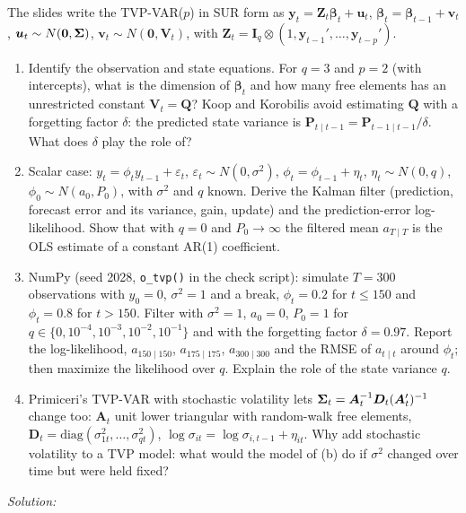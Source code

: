\documentclass[11pt,a4paper]{article}
\newif\ifsolucoes
\newcommand{\espacoresol}{4.5cm}   %
\newcommand{\resolespaco}{\ifsolucoes\else\par\textit{Solution:}\vspace{\espacoresol}\par\fi}
\begin{document}
The slides write the TVP-VAR($p$) in SUR form as $\bm y_t=\bm Z_t\bm\beta_t+\bm u_t$, $\bm\beta_t=\bm\beta_{t-1}+\bm v_t$,
$\bm u_t\sim N(\bm0,\bm{\Sigma})$, $\bm v_t\sim N(\bm0,\bm V_t)$, with $\bm Z_t=\bm I_q\otimes(1,\bm y_{t-1}',\dots,\bm y_{t-p}')$.
\begin{enumerate}[label=(\alph*),leftmargin=2em]
\item Identify the observation and state equations. For $q=3$ and $p=2$ (with intercepts), what is the dimension of
$\bm\beta_t$ and how many free elements has an unrestricted constant $\bm V_t=\bm Q$? Koop and Korobilis avoid
estimating $\bm Q$ with a forgetting factor $\delta$: the predicted state variance is $\bm P_{t\mid t-1}=\bm P_{t-1\mid t-1}/\delta$.
What does $\delta$ play the role of?
\item Scalar case: $y_t=\phi_ty_{t-1}+\varepsilon_t$, $\varepsilon_t\sim N(0,\sigma^2)$, $\phi_t=\phi_{t-1}+\eta_t$, $\eta_t\sim N(0,q)$,
$\phi_0\sim N(a_0,P_0)$, with $\sigma^2$ and $q$ known. Derive the Kalman filter (prediction, forecast error and its
variance, gain, update) and the prediction-error log-likelihood. Show that with $q=0$ and $P_0\to\infty$ the filtered
mean $a_{T\mid T}$ is the OLS estimate of a constant AR(1) coefficient.
\item NumPy (seed 2028, \texttt{o\_tvp()} in the check script): simulate $T=300$ observations with $y_0=0$, $\sigma^2=1$ and a
break, $\phi_t=0.2$ for $t\le150$ and $\phi_t=0.8$ for $t>150$. Filter with $\sigma^2=1$, $a_0=0$, $P_0=1$ for
$q\in\{0,10^{-4},10^{-3},10^{-2},10^{-1}\}$ and with the forgetting factor $\delta=0.97$. Report the log-likelihood,
$a_{150\mid150}$, $a_{175\mid175}$, $a_{300\mid300}$ and the RMSE of $a_{t\mid t}$ around $\phi_t$; then maximize the
likelihood over $q$. Explain the role of the state variance $q$.
\item Primiceri's TVP-VAR with stochastic volatility lets $\bm{\Sigma}_t=\bm A_t^{-1}\bm D_t(\bm A_t')^{-1}$ change too:
$\bm A_t$ unit lower triangular with random-walk free elements, $\bm D_t=\mathrm{diag}(\sigma_{1t}^2,\dots,\sigma_{qt}^2)$,
$\log\sigma_{it}=\log\sigma_{i,t-1}+\eta_{it}$. Why add stochastic volatility to a TVP model: what would the model of (b)
do if $\sigma^2$ changed over time but were held fixed?
\end{enumerate}
\resolespaco
\end{document}
